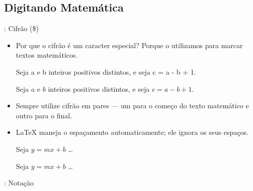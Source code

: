 \documentclass{beamer}
\begin{document}
\subsection{Digitando Matemática}
\begin{frame}[fragile]{\insertsubsection{}: Cifrão (\$)}
\begin{itemize}
\item Por que o cifrão  \keystrokebftt{\$} é um caracter especial? Porque
o utilizamos para marcar textos matemáticos.\\[1ex]
\begin{exampletwouptiny}
Seja a e b inteiros positivos 
distintos, e seja  
c = a - b + 1.

Seja $a$ e $b$ inteiros positivos 
distintos, e seja
$c = a - b + 1$.
\end{exampletwouptiny}
\item Sempre utilize cifrão em pares --- um para o começo do texto matemático e
outro para o final.
\item \LaTeX{} maneja o espaçamento automaticamente; ele ignora os seus espaços.
\begin{exampletwouptiny}
Seja $y=mx+b$  \ldots

Seja $y = m x + b$  \ldots
\end{exampletwouptiny}
\end{itemize}
\end{frame}

\begin{frame}[fragile]{\insertsubsection{}: Notação}
\end{frame}
\end{document}
